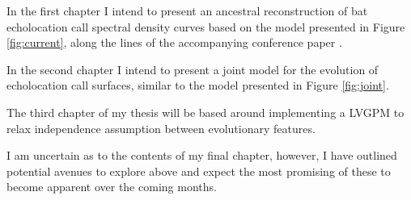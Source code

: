 \documentclass[]{article}
\begin{document}
In the first chapter I intend to present an ancestral reconstruction of bat echolocation call spectral density curves based on the model presented in Figure \ref{fig:current}, along the lines of the accompanying conference paper \cite{meagher2017pgp}.

In the second chapter I intend to present a joint model for the evolution of echolocation call surfaces, similar to the model presented in Figure \ref{fig:joint}.

The third chapter of my thesis will be based around implementing a LVGPM to relax independence assumption between evolutionary features.

I am uncertain as to the contents of my final chapter, however, I have outlined potential avenues to explore above and expect the most promising of these to become apparent over the coming months. 




\end{document}
